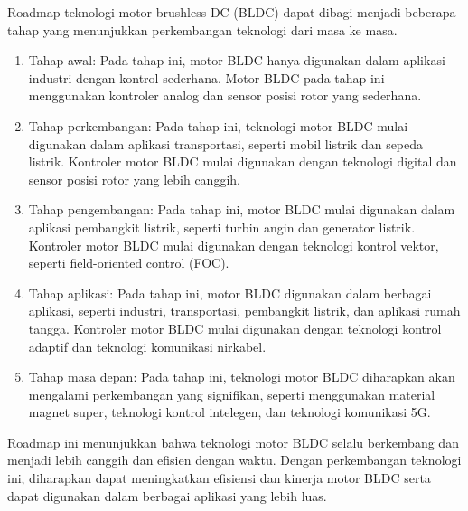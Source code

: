 Roadmap teknologi motor brushless DC (BLDC) dapat dibagi menjadi beberapa tahap yang menunjukkan perkembangan teknologi dari masa ke masa.
\begin{enumerate}
    \item Tahap awal: Pada tahap ini, motor BLDC hanya digunakan dalam aplikasi industri dengan kontrol sederhana. Motor BLDC pada tahap ini menggunakan kontroler analog dan sensor posisi rotor yang sederhana.
    \item Tahap perkembangan: Pada tahap ini, teknologi motor BLDC mulai digunakan dalam aplikasi transportasi, seperti mobil listrik dan sepeda listrik. Kontroler motor BLDC mulai digunakan dengan teknologi digital dan sensor posisi rotor yang lebih canggih.
    \item Tahap pengembangan: Pada tahap ini, motor BLDC mulai digunakan dalam aplikasi pembangkit listrik, seperti turbin angin dan generator listrik. Kontroler motor BLDC mulai digunakan dengan teknologi kontrol vektor, seperti field-oriented control (FOC).
    \item Tahap aplikasi: Pada tahap ini, motor BLDC digunakan dalam berbagai aplikasi, seperti industri, transportasi, pembangkit listrik, dan aplikasi rumah tangga. Kontroler motor BLDC mulai digunakan dengan teknologi kontrol adaptif dan teknologi komunikasi nirkabel.
    \item Tahap masa depan: Pada tahap ini, teknologi motor BLDC diharapkan akan mengalami perkembangan yang signifikan, seperti menggunakan material magnet super, teknologi kontrol intelegen, dan teknologi komunikasi 5G.
\end{enumerate}
Roadmap ini menunjukkan bahwa teknologi motor BLDC selalu berkembang dan menjadi lebih canggih dan efisien dengan waktu. Dengan perkembangan teknologi ini, diharapkan dapat meningkatkan efisiensi dan kinerja motor BLDC serta dapat digunakan dalam berbagai aplikasi yang lebih luas.

